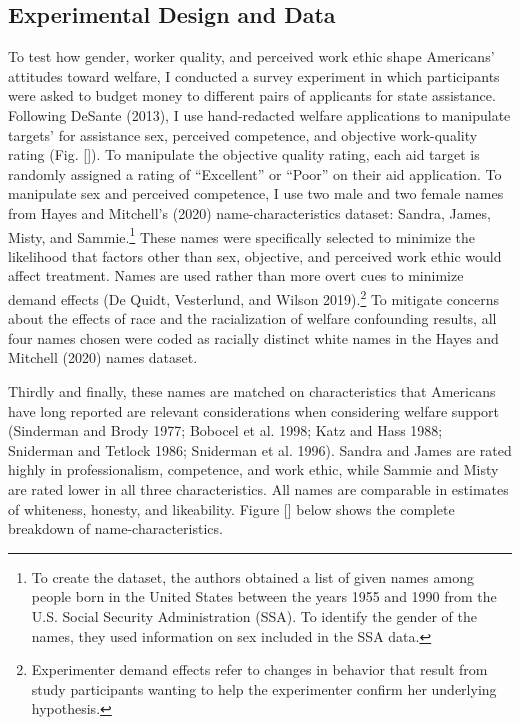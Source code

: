 \documentclass[12pt]{article}%
\begin{document}
\begin{doublespace}
\section*{Experimental Design and Data}
To test how gender, worker quality, and perceived work ethic shape Americans’ attitudes toward welfare, I conducted a survey experiment in which participants were asked to budget money to different pairs of applicants for state assistance. Following DeSante (2013), I use hand-redacted welfare applications to manipulate targets’ for assistance sex, perceived competence, and objective work-quality rating (Fig. []). To manipulate the objective quality rating, each aid target is randomly assigned a rating of “Excellent” or “Poor” on their aid application. To manipulate sex and perceived competence, I use two male and two female names from Hayes and Mitchell’s (2020) name-characteristics dataset: Sandra, James, Misty, and Sammie.\footnote{To create the dataset, the authors obtained a list of given names among people born in the United States between the years 1955 and 1990 from the U.S. Social Security Administration (SSA). To identify the gender of the names, they used information on sex included in the SSA data.} These names were specifically selected to minimize the likelihood that factors other than sex, objective, and perceived work ethic would affect treatment. Names are used rather than more overt cues to minimize demand effects (De Quidt, Vesterlund, and Wilson 2019).\footnote{Experimenter demand effects refer to changes in behavior that result from study participants wanting to help the experimenter confirm her underlying hypothesis.} To mitigate concerns about the effects of race and the racialization of welfare confounding results, all four names chosen were coded as racially distinct white names in the Hayes and Mitchell (2020) names dataset.


Thirdly and finally, these names are matched on characteristics that Americans have long reported are relevant considerations when considering welfare support (Sinderman and Brody 1977; Bobocel et al. 1998; Katz and Hass 1988; Sniderman and Tetlock 1986; Sniderman et al. 1996). Sandra and James are rated highly in professionalism, competence, and work ethic, while Sammie and Misty are rated lower in all three characteristics. All names are comparable in estimates of whiteness, honesty, and likeability. Figure [] below shows the complete breakdown of name-characteristics.



\end{doublespace}
\end{document}
